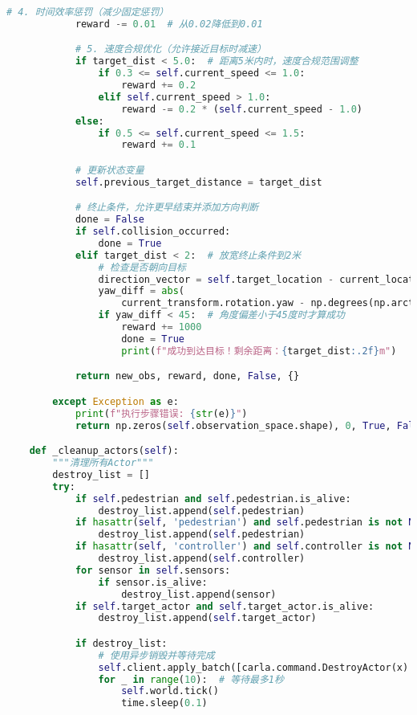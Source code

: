 \begin{lstlisting}[language=Python]
            # 4. 时间效率惩罚（减少固定惩罚）
            reward -= 0.01  # 从0.02降低到0.01

            # 5. 速度合规优化（允许接近目标时减速）
            if target_dist < 5.0:  # 距离5米内时，速度合规范围调整
                if 0.3 <= self.current_speed <= 1.0:
                    reward += 0.2
                elif self.current_speed > 1.0:
                    reward -= 0.2 * (self.current_speed - 1.0)
            else:
                if 0.5 <= self.current_speed <= 1.5:
                    reward += 0.1

            # 更新状态变量
            self.previous_target_distance = target_dist

            # 终止条件，允许更早结束并添加方向判断
            done = False
            if self.collision_occurred:
                done = True
            elif target_dist < 2:  # 放宽终止条件到2米
                # 检查是否朝向目标
                direction_vector = self.target_location - current_location
                yaw_diff = abs(
                    current_transform.rotation.yaw - np.degrees(np.arctan2(-direction_vector.y, direction_vector.x)))
                if yaw_diff < 45:  # 角度偏差小于45度时才算成功
                    reward += 1000
                    done = True
                    print(f"成功到达目标！剩余距离：{target_dist:.2f}m")

            return new_obs, reward, done, False, {}

        except Exception as e:
            print(f"执行步骤错误: {str(e)}")
            return np.zeros(self.observation_space.shape), 0, True, False, {}

    def _cleanup_actors(self):
        """清理所有Actor"""
        destroy_list = []
        try:
            if self.pedestrian and self.pedestrian.is_alive:
                destroy_list.append(self.pedestrian)
            if hasattr(self, 'pedestrian') and self.pedestrian is not None and self.pedestrian.is_alive:
                destroy_list.append(self.pedestrian)
            if hasattr(self, 'controller') and self.controller is not None and self.controller.is_alive:
                destroy_list.append(self.controller)
            for sensor in self.sensors:
                if sensor.is_alive:
                    destroy_list.append(sensor)
            if self.target_actor and self.target_actor.is_alive:
                destroy_list.append(self.target_actor)

            if destroy_list:
                # 使用异步销毁并等待完成
                self.client.apply_batch([carla.command.DestroyActor(x) for x in destroy_list])
                for _ in range(10):  # 等待最多1秒
                    self.world.tick()
                    time.sleep(0.1)


\end{lstlisting}
